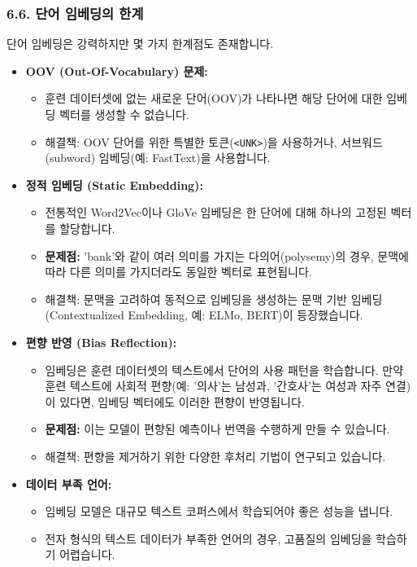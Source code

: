 \documentclass[11pt,a4paper]{article}
\theoremstyle{definition}
\begin{document}
\subsubsection{6.6. 단어 임베딩의 한계}
단어 임베딩은 강력하지만 몇 가지 한계점도 존재합니다.

\begin{itemize}
    \item \textbf{OOV (Out-Of-Vocabulary) 문제:}
    \begin{itemize}
        \item 훈련 데이터셋에 없는 새로운 단어(OOV)가 나타나면 해당 단어에 대한 임베딩 벡터를 생성할 수 없습니다.
        \item 해결책: OOV 단어를 위한 특별한 토큰(\texttt{<UNK>})을 사용하거나, 서브워드(subword) 임베딩(예: FastText)을 사용합니다.
    \end{itemize}
    \item \textbf{정적 임베딩 (Static Embedding):}
    \begin{itemize}
        \item 전통적인 Word2Vec이나 GloVe 임베딩은 한 단어에 대해 하나의 고정된 벡터를 할당합니다.
        \item \textbf{문제점:} 'bank'와 같이 여러 의미를 가지는 다의어(polysemy)의 경우, 문맥에 따라 다른 의미를 가지더라도 동일한 벡터로 표현됩니다.
        \item 해결책: 문맥을 고려하여 동적으로 임베딩을 생성하는 문맥 기반 임베딩(Contextualized Embedding, 예: ELMo, BERT)이 등장했습니다.
    \end{itemize}
    \item \textbf{편향 반영 (Bias Reflection):}
    \begin{itemize}
        \item 임베딩은 훈련 데이터셋의 텍스트에서 단어의 사용 패턴을 학습합니다. 만약 훈련 텍스트에 사회적 편향(예: '의사'는 남성과, '간호사'는 여성과 자주 연결)이 있다면, 임베딩 벡터에도 이러한 편향이 반영됩니다.
        \item \textbf{문제점:} 이는 모델이 편향된 예측이나 번역을 수행하게 만들 수 있습니다.
        \item 해결책: 편향을 제거하기 위한 다양한 후처리 기법이 연구되고 있습니다.
    \end{itemize}
    \item \textbf{데이터 부족 언어:}
    \begin{itemize}
        \item 임베딩 모델은 대규모 텍스트 코퍼스에서 학습되어야 좋은 성능을 냅니다.
        \item 전자 형식의 텍스트 데이터가 부족한 언어의 경우, 고품질의 임베딩을 학습하기 어렵습니다.
    \end{itemize}
\end{itemize}
\end{document}
